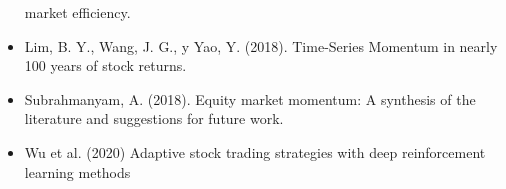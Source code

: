 \documentclass[a0,portrait]{a0poster}
\begin{document}
\begin{multicols}{2}
\begin{itemize}
            market efficiency.
            \vspace{-1 cm}
            \item Lim, B. Y., Wang, J. G., y Yao, Y. (2018). Time-Series Momentum in nearly 100 years of stock returns.            
            \vspace{-1 cm}
            \item Subrahmanyam, A. (2018). Equity market momentum: A synthesis of the literature and suggestions for future work.
            \vspace{-1 cm}
            \item Wu et al. (2020) Adaptive stock trading strategies with deep reinforcement learning methods
        \end{itemize}
        
    
    
    

    
\end{multicols}
\end{document}
